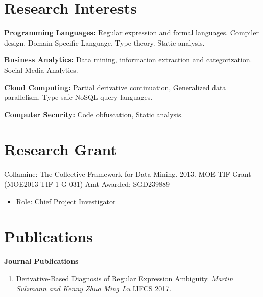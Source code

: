 \documentclass[margin,line]{res}
\newcommand{\researchonly}[1]{#1}
\begin{document}
\begin{resume}
\researchonly{
\section{\sc Research Interests}
{\bf Programming Languages:} Regular expression and formal
languages. Compiler design. Domain Specific Language. Type
theory. Static analysis.

{\bf Business Analytics:} Data mining, information extraction and categorization. Social Media Analytics.

{\bf Cloud Computing:} Partial derivative continuation, Generalized
data parallelism, Type-safe NoSQL query languages.

{\bf Computer Security:} Code obfuscation, Static analysis.

\section{\sc Research Grant}
Collamine: The Collective Framework for Data Mining. 2013. MOE TIF
Grant (MOE2013-TIF-1-G-031) Amt Awarded: SGD239889
    \begin{itemize}
       \item Role: Chief Project Investigator
    \end{itemize}




\section{\sc Publications}

{\bf Journal Publications}
\begin{enumerate}
\item Derivative-Based Diagnosis of Regular Expression
  Ambiguity. \textit{Martin Sulzmann and Kenny Zhuo Ming Lu} IJFCS 2017.
\end{enumerate}


}
\end{resume}
\end{document}
